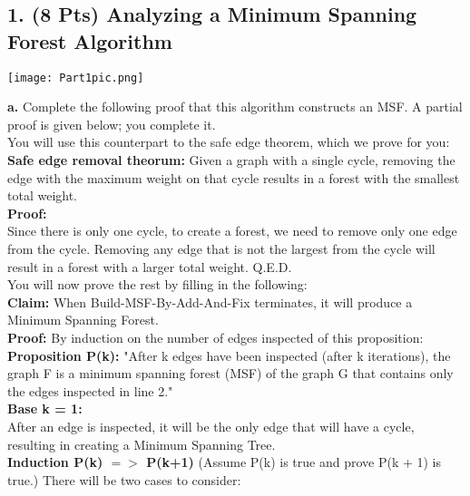 \documentclass[12pt]{article}
\begin{document}
\subsection*{1.  (8 Pts) Analyzing a Minimum Spanning Forest Algorithm}
 \begin{center}
 \texttt{[image: Part1pic.png]}\\
 \end{center}
 \textbf{a.} Complete the following proof that this algorithm constructs an MSF. A partial proof is given below; you complete it. \\
 \linebreak
 You will use this counterpart to the safe edge theorem, which we prove for you: \\
 \linebreak
 \textbf{Safe edge removal theorum:} Given a graph with a single cycle, removing the edge with the maximum weight on that cycle results in a forest with the smallest total weight. \\
 \linebreak
 \textbf{Proof:} \\
 Since there is only one cycle, to create a forest, we need to remove only one edge from the cycle. Removing any edge that is not the largest from the cycle will result in a forest with a larger total weight. Q.E.D. \\
 \linebreak
 You will now prove the rest by filling in the following: \\
 \linebreak
 \textbf{Claim:} When Build-MSF-By-Add-And-Fix terminates, it will produce a Minimum Spanning Forest. \\
 \linebreak
 \textbf{Proof:} By induction on the number of edges inspected of this proposition: \\
 \textbf{Proposition P(k):} "After k edges have been inspected (after k iterations), the graph F is a minimum spanning forest (MSF) of the graph G that contains only the edges inspected in line 2." \\
 \linebreak
 \textbf{Base k = 1:}\\
 After an edge is inspected, it will be the only edge that will have a cycle, resulting in creating a Minimum Spanning Tree. \\
 \linebreak
 \textbf{Induction P(k) $=>$ P(k+1)} (Assume P(k) is true and prove P(k + 1) is true.) There will be two cases to consider: \\
\end{document}
